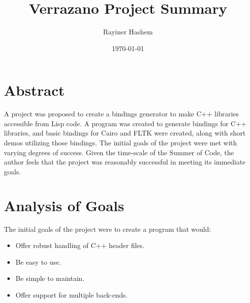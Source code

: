 \documentclass[12pt]{article}
\begin{document}
\title{Verrazano Project Summary}
\author{Rayiner Hashem}
\date{\today}
\maketitle

\section{Abstract}

A project was proposed to create a bindings generator to make C++
libraries accessible from Lisp code. A program was created to generate bindings for C++ libraries, and basic bindings for Cairo and FLTK were created, along with short demos utilizing those bindings. The initial goals of the project were met with varying degrees of success. Given the time-scale of the Summer of Code, the author feels that the project was reasonably successful in meeting its immediate goals. 

\section{Analysis of Goals}

The initial goals of the project were to
create a program that would:

\begin{itemize}
\item Offer robust handling of C++ header files.
\item Be easy to use.
\item Be simple to maintain.
\item Offer support for multiple back-ends.
\end{itemize}
\end{document}
